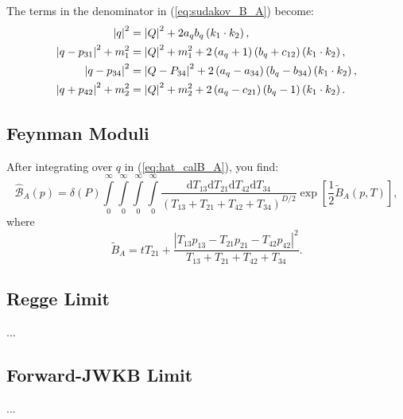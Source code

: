 The terms in the denominator in (\ref{eq:sudakov_B_A}) become:
\begin{align}
	\left\lvert q \right\rvert^{2} &= \left\lvert Q \right\rvert^{2} + 2 a_{q} b_{q} \left(k_{1} \cdot k_{2}\right), \\
	\left\lvert q - p_{31} \right\rvert^{2} + m_{1}^{2} &= \left\lvert Q \right\rvert^{2} + m_{1}^{2} + 2 \left(a_{q} + 1\right)\left(b_{q} + c_{12}\right)\left(k_{1} \cdot k_{2}\right), \\
	\left\lvert q - p_{34} \right\rvert^{2} &= \left\lvert Q - P_{34} \right\rvert^{2} + 2 \left(a_{q} - a_{34}\right)\left(b_{q} - b_{34}\right)\left(k_{1} \cdot k_{2}\right), \\
	\left\lvert q + p_{42} \right\rvert^{2} + m_{2}^{2} &= \left\lvert Q \right\rvert^{2} + m_{2}^{2} + 2 \left(a_{q} - c_{21}\right)\left(b_{q} - 1\right)\left(k_{1} \cdot k_{2}\right).
\end{align}
\subsection{Feynman Moduli}
After integrating over $q$ in (\ref{eq:hat_calB_A}), you find:
\begin{equation}
	\widehat{\mathcal{B}}_{A}(p) = \delta(P) \int\limits_{0}^{\infty} \int\limits_{0}^{\infty} \int\limits_{0}^{\infty} \int\limits_{0}^{\infty} \frac{\mathrm{d}T_{13} \mathrm{d}T_{21} \mathrm{d}T_{42} \mathrm{d}T_{34}}{(T_{13} + T_{21} + T_{42} + T_{34})^{D/2}} \exp{\left[ \frac{1}{2} \tilde{B}_{A}(p, T) \right]},
\end{equation}
where
\begin{equation}
	\tilde{B}_{A} = t T_{21} + \frac{|T_{13} p_{13} - T_{21} p_{21} - T_{42} p_{42}|^{2}}{T_{13} + T_{21} + T_{42} + T_{34}}.
\end{equation}
\subsection{Regge Limit}
...
\subsection{Forward-JWKB Limit}
...
